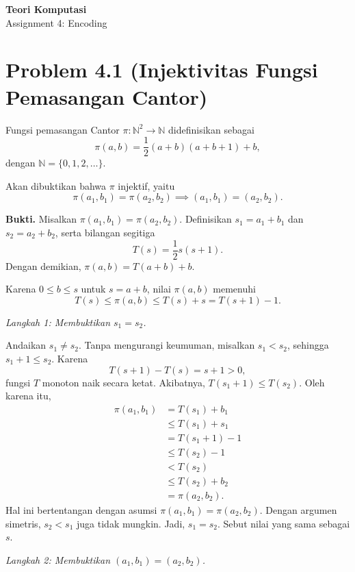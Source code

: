 \documentclass[12pt, a4paper, bahasa]{article}
\begin{document}
\begin{center}
    \large \textbf{Teori Komputasi} \\[0.2cm]
    \large Assignment 4: Encoding \\[0.5cm]
\end{center}



\section{Problem 4.1 (Injektivitas Fungsi Pemasangan Cantor)}

Fungsi pemasangan Cantor $\pi:\mathbb{N}^2\to\mathbb{N}$
didefinisikan sebagai
\[
\pi(a,b)=\frac{1}{2}(a+b)(a+b+1)+b,
\]
dengan $\mathbb{N}=\{0,1,2,\dots\}$.

Akan dibuktikan bahwa $\pi$ injektif, yaitu
\[
\pi(a_1,b_1)=\pi(a_2,b_2)
\implies (a_1,b_1)=(a_2,b_2).
\]

\par\vspace{0.5em}
\noindent\textbf{Bukti.}
Misalkan $\pi(a_1,b_1)=\pi(a_2,b_2)$.
Definisikan $s_1=a_1+b_1$ dan $s_2=a_2+b_2$,
serta bilangan segitiga
\[
T(s)=\frac{1}{2}s(s+1).
\]
Dengan demikian, $\pi(a,b)=T(a+b)+b$.

Karena $0\leq b\leq s$ untuk $s=a+b$, nilai
$\pi(a,b)$ memenuhi
\[
T(s)\leq \pi(a,b)\leq T(s)+s=T(s+1)-1.
\]

\textit{Langkah 1: Membuktikan $s_1=s_2$.}

Andaikan $s_1\neq s_2$. Tanpa mengurangi keumuman,
misalkan $s_1<s_2$, sehingga $s_1+1\leq s_2$.
Karena
\[
T(s+1)-T(s)=s+1>0,
\]
fungsi $T$ monoton naik secara ketat. Akibatnya,
$T(s_1+1)\leq T(s_2)$. Oleh karena itu,
\begin{align*}
\pi(a_1,b_1)
&=T(s_1)+b_1\\
&\leq T(s_1)+s_1\\
&=T(s_1+1)-1\\
&\leq T(s_2)-1\\
&<T(s_2)\\
&\leq T(s_2)+b_2\\
&=\pi(a_2,b_2).
\end{align*}
Hal ini bertentangan dengan asumsi
$\pi(a_1,b_1)=\pi(a_2,b_2)$.
Dengan argumen simetris, $s_2<s_1$ juga tidak mungkin.
Jadi, $s_1=s_2$. Sebut nilai yang sama sebagai $s$.

\textit{Langkah 2: Membuktikan
$(a_1,b_1)=(a_2,b_2)$.}
\end{document}
